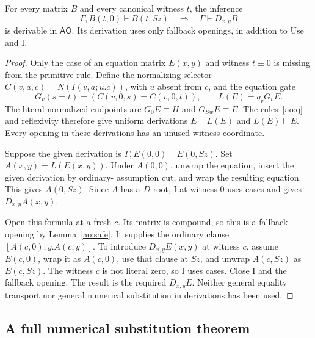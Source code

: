 \begin{lemma}
\label{ao:all-case}
For every matrix $B$ and every canonical witness $t$, the inference
\[
       \Gamma,B(t,0)\vdash B(t,Sz)
       \quad\Longrightarrow\quad
       \Gamma\vdash D_{x,y}B
\]
is derivable in $\mathsf{AO}$.  Its derivation uses only fallback
openings, in addition to Use and I.
\end{lemma}
\begin{proof}
Only the case of an equation matrix $E(x,y)$ and witness $t\equiv0$
is missing from the primitive rule.  Define the normalizing selector
$C(v,a,c)=N(I(v,a;u.c))$, with $u$ absent from $c$, and the equation gate
\[
 G_v(s=t)=(C(v,0,s)=C(v,0,t)),\qquad L(E)=q_vG_vE.
\]
The literal normalized endpoints are $G_0E\equiv H$ and
$G_{Sw}E\equiv E$.  The rules~\eqref{ao:q} and reflexivity therefore
give uniform derivations $E\vdash L(E)$ and $L(E)\vdash E$.  Every
opening in these derivations has an unused witness coordinate.

Suppose the given derivation is
$\Gamma,E(0,0)\vdash E(0,Sz)$.  Set $A(x,y)=L(E(x,y))$.  Under
$A(0,0)$, unwrap the equation, insert the given derivation by ordinary-
assumption cut, and wrap the resulting equation.  This gives $A(0,Sz)$.
Since $A$ has a $D$ root, I at witness $0$ uses cases and gives
$D_{x,y}A(x,y)$.

Open this formula at a fresh $c$.  Its matrix is compound, so this is
a fallback opening by Lemma~\ref{ao:safe}.  It supplies the ordinary
clause $[A(c,0);y.A(c,y)]$.  To introduce $D_{x,y}E(x,y)$ at witness
$c$, assume $E(c,0)$, wrap it as $A(c,0)$, use that clause at $Sz$,
and unwrap $A(c,Sz)$ as $E(c,Sz)$.  The witness $c$ is not literal
zero, so I uses cases.  Close I and the fallback opening.  The result
is the required $D_{x,y}E$.  Neither general equality transport nor
general numerical substitution in derivations has been used.
\end{proof}

\subsection{A full numerical substitution theorem}

